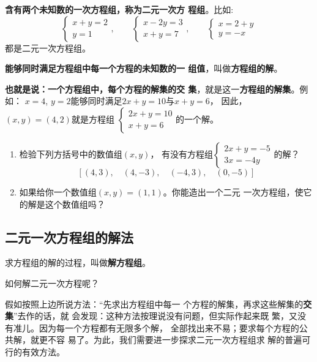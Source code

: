 \textbf{含有两个未知数的一次方程组，称为二元一次方
程组}。比如:
\[\begin{cases}
    x+y=2\\
    y=1 
 \end{cases},\qquad \begin{cases}
     x-2y=3\\
     x+y=7
 \end{cases},\qquad \begin{cases}
    x=2+y\\
    y=-x
\end{cases}\]   
都是二元一次方程组。

\textbf{能够同时满足方程组中每一个方程的未知数的一
组值}，叫做\textbf{方程组的解}。

\textbf{也就是说：一个方程组中，每个方程的解集的交
集}，就是这一\textbf{方程组的解集}。例如：
    $x=4$,  $y=2$能够同时满足$2x+y=10$与$x+y=6$，
因此，$(x,y)=(4,2)$就是方程组
$\begin{cases}
    2x+y=10\\
    x+y=6 
 \end{cases}$的一个解。

\begin{ex}
\begin{enumerate}
    \item 检验下列方括号中的数值组$(x,y)$，
    有没有方程组$\begin{cases}
        2x+y=-5\\
        3x=-4y 
     \end{cases}$的解？
    \[[(4,3),\quad (4,-3),\quad (-4,3), \quad (0,-5)  ] \]

    \item 如果给你一个数值组$(x,  y) = (1,1)$。你能造出一个二元
    一次方程组，使它的解是这个数值组吗？
\end{enumerate}
\end{ex}

\subsection{二元一次方程组的解法}
    求方程组的解的过程，叫做\textbf{解方程组}。

    如何解二元一次方程呢？

    假如按照上边所说方法：“先求出方程组中每一
个方程的解集，再求这些解集的\textbf{交集}”去作的话，就
会发现：这种方法按理说没有问题，但实际作起来既
繁，又没有准儿。因为每一个方程都有无限多个解，
全部找出来不易；要求每个方程的公共解，就更不容
易了。为此，我们需要进一步探求二元一次方程组求
解的普遍可行的有效方法。

